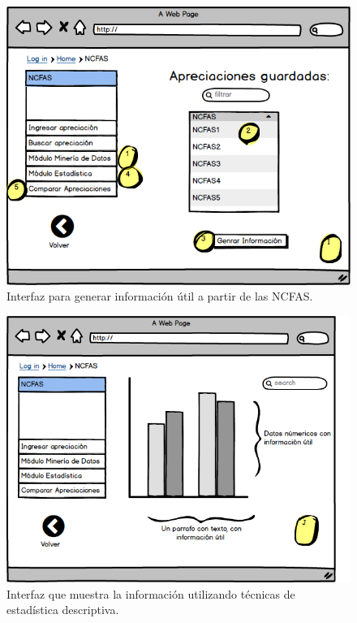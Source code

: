 \begin{figure}[h!]
	\label{generainfo}
	\begin{center}
		\includegraphics[scale=0.3]{imagenes/generainfo.png}
	\end{center}
	\caption{Interfaz para generar información útil a partir de las NCFAS.}
\end{figure}

\begin{figure}[h!]
	\label{estadistic}
	\begin{center}
		\includegraphics[scale=0.3]{imagenes/estadistic.png}
	\end{center}
	\caption{Interfaz que muestra la información utilizando técnicas de estadística descriptiva.}
\end{figure}

